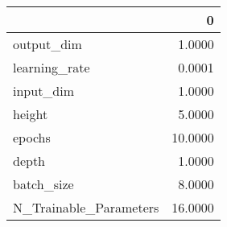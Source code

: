 \begin{tabular}{lr}
\toprule
{} &        0 \\
\midrule
output\_dim             &   1.0000 \\
learning\_rate          &   0.0001 \\
input\_dim              &   1.0000 \\
height                 &   5.0000 \\
epochs                 &  10.0000 \\
depth                  &   1.0000 \\
batch\_size             &   8.0000 \\
N\_Trainable\_Parameters &  16.0000 \\
\bottomrule
\end{tabular}
